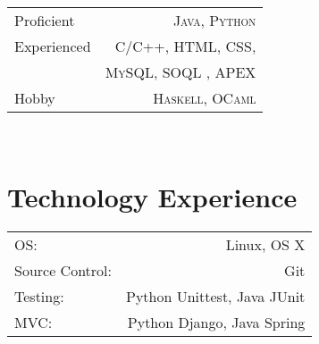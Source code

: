 \documentclass[10pt]{article} %
\begin{document}
\begin{minipage}[t]{0.44\textwidth}
\begin{tabular}{l r}
Proficient
& \textsc{Java}, \textsc{Python} \\ 
Experienced
& \textsc{C/C++}, \textsc{HTML}, \textsc{CSS}, \\
& \textsc{MySQL, SOQL} , \textsc{APEX}\\
Hobby
& \textsc{Haskell}, \textsc{OCaml}
\end{tabular}\\

\section{\color{section} \sffamily Technology Experience}
\begin{tabular}{lr}
OS: & Linux, OS X \\
Source Control: & Git \\
Testing: & Python Unittest, Java JUnit \\
MVC: & Python Django, Java Spring \\
\end{tabular}

\end{minipage} %
\end{document}
